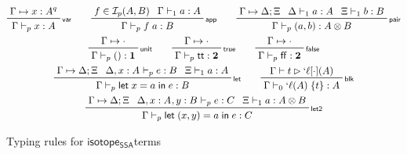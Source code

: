 \documentclass[acmsmall,screen,review]{acmart}
\newcommand{\mc}[1]{\ensuremath{\mathcal{#1}}}
\newcommand{\mb}[1]{\ensuremath{\mathbf{#1}}}
\newcommand{\ms}[1]{\ensuremath{\mathsf{#1}}}
\newcommand{\lbl}[1]{{`#1}}
\newcommand{\ctt}{\ms{tt}}
\newcommand{\cff}{\ms{ff}}
\newcommand{\letexpr}[3]{\ensuremath{\ms{let}\;#1 = #2\;\ms{in}\;#3}}
\newcommand{\bsplice}[3]{#1(#2)\;\{#3\}}
\newcommand{\lbsplice}[3]{\bsplice{\lbl{#1}}{#2}{#3}}
\newcommand{\csplits}[3]{#1 \mapsto #2;#3}
\newcommand{\cwk}[2]{#1 \mapsto #2}
\newcommand{\thyp}[3]{#1: {#2}^{#3}}
\newcommand{\lhyp}[3]{#1[#2](#3)}
\newcommand{\llhyp}[3]{\lhyp{\lbl{#1}}{#2}{#3}}
\newcommand{\rle}[1]{{\scriptsize\textsf{#1}}}
\newcommand{\hasty}[4]{#1 \vdash_{#2} #3: #4}
\newcommand{\haslb}[3]{#1 \vdash #2 \rhd #3}
\newcommand{\isotopessa}{\ms{isotope_{SSA}}}
\begin{document}
\begin{figure}
  \begin{gather*}    
    \prftree[r]{\rle{var}}
      {\cwk{\Gamma}{\thyp{x}{A}{q}}}
      {\hasty{\Gamma}{p}{x}{A}} \qquad
    \prftree[r]{\rle{app}}
      {f \in \mc{I}_p(A, B)}
      {\hasty{\Gamma}{1}{a}{A}}
      {\hasty{\Gamma}{p}{f\;a}{B}} \qquad
    \prftree[r]{\rle{pair}}
      {\csplits{\Gamma}{\Delta}{\Xi}}
      {\hasty{\Delta}{1}{a}{A}}
      {\hasty{\Xi}{1}{b}{B}}
      {\hasty{\Gamma}{p}{(a, b)}{A \otimes B}} \\
    \prftree[r]{\rle{unit}}
      {\cwk{\Gamma}{\cdot}}
      {\hasty{\Gamma}{p}{()}{\mb{1}}} \qquad
    \prftree[r]{\rle{true}}
      {\cwk{\Gamma}{\cdot}}
      {\hasty{\Gamma}{p}{\ctt}{\mb{2}}} \qquad
    \prftree[r]{\rle{false}}
      {\cwk{\Gamma}{\cdot}}
      {\hasty{\Gamma}{p}{\cff}{\mb{2}}} \\
    \prftree[r]{\rle{let}}
      {\csplits{\Gamma}{\Delta}{\Xi}}
      {\hasty{\Delta, \thyp{x}{A}{}}{p}{e}{B}}
      {\hasty{\Xi}{1}{a}{A}}
      {\hasty{\Gamma}{p}{\letexpr{x}{a}{e}}{B}} \qquad
    \prftree[r]{\rle{blk}}
      {\haslb{\Gamma}{t}{\llhyp{\ell}{\cdot}{A}}}
      {\hasty{\Gamma}{0}{\lbsplice{\ell}{A}{t}}{A}} \\
    \prftree[r]{\rle{let2}}
      {\csplits{\Gamma}{\Delta}{\Xi}}
      {\hasty{\Delta, \thyp{x}{A}{}, \thyp{y}{B}{}}{p}{e}{C}}
      {\hasty{\Xi}{1}{a}{A \otimes B}}
      {\hasty{\Gamma}{p}{\letexpr{(x, y)}{a}{e}}{C}}
  \end{gather*}
  \caption{Typing rules for \isotopessa terms}
  \label{fig:ssa-term-typing}
\end{figure}
\end{document}
